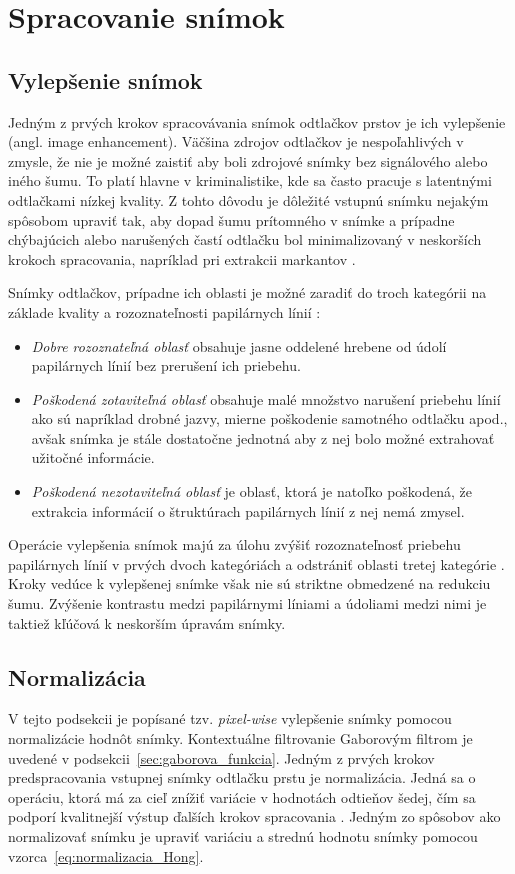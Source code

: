   \section{Spracovanie snímok}
  \subsection{Vylepšenie snímok} \label{sec:vylepsenie_snimok}
  Jedným z prvých krokov spracovávania snímok odtlačkov prstov je ich vylepšenie (angl. image enhancement). Väčšina zdrojov odtlačkov je nespoľahlivých
  v zmysle, že nie je možné zaistiť aby boli zdrojové snímky bez signálového alebo iného šumu. To platí hlavne v kriminalistike,
  kde sa často pracuje s latentnými odtlačkami nízkej kvality. Z tohto dôvodu je dôležité vstupnú snímku nejakým spôsobom upraviť tak,
  aby dopad šumu prítomného v snímke a prípadne chýbajúcich alebo narušených častí odtlačku bol minimalizovaný v neskorších krokoch spracovania,
  napríklad pri extrakcii markantov \cite{Handbook}.

  Snímky odtlačkov, prípadne ich oblasti je možné zaradiť do troch kategórii na základe kvality a rozoznateľnosti papilárnych línií \cite{Hong}:
  \begin{itemize}
    \item \emph{Dobre rozoznateľná oblasť} obsahuje jasne oddelené hrebene od údolí papilárnych línií bez prerušení ich priebehu.
    \item \emph{Poškodená zotaviteľná oblasť} obsahuje malé množstvo narušení priebehu línií ako sú napríklad drobné jazvy, mierne poškodenie
          samotného odtlačku apod., avšak snímka je stále dostatočne jednotná aby z nej bolo možné extrahovať užitočné informácie.
    \item \emph{Poškodená nezotaviteľná oblasť} je oblasť, ktorá je natoľko poškodená, že extrakcia informácií o štruktúrach papilárnych línií
          z nej nemá zmysel.
  \end{itemize}
  Operácie vylepšenia snímok majú za úlohu zvýšiť rozoznateľnosť priebehu papilárnych línií v prvých dvoch kategóriách a odstrániť oblasti tretej
  kategórie \cite{Hong}.
  Kroky vedúce k vylepšenej snímke však nie sú striktne obmedzené na redukciu šumu. Zvýšenie kontrastu medzi papilárnymi líniami a údoliami medzi nimi
  je taktiež kľúčová k neskorším úpravám snímky.

  \subsection{Normalizácia} \label{sec:normalizacia}
  V tejto podsekcii je popísané tzv. \emph{pixel-wise} vylepšenie snímky pomocou normalizácie hodnôt snímky. Kontextuálne filtrovanie Gaborovým
  filtrom je uvedené v podsekcii~{\ref{sec:gaborova_funkcia}}.
  Jedným z prvých krokov predspracovania vstupnej snímky odtlačku prstu je normalizácia. Jedná sa o operáciu, ktorá má za cieľ znížiť variácie
  v hodnotách odtieňov šedej, čím sa podporí kvalitnejší výstup ďalších krokov spracovania \cite{Hong}. Jedným zo spôsobov ako normalizovať
  snímku je upraviť variáciu a strednú hodnotu snímky pomocou vzorca~{\ref{eq:normalizacia_Hong}}.

